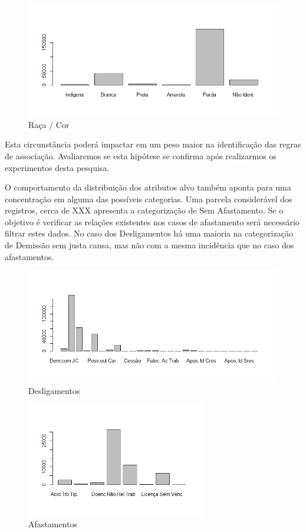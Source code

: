 \documentclass[12pt]{article}
\begin{document}
\FloatBarrier
\begin{figure}[!htb]
\centering
\includegraphics[width=1.0\textwidth]{Raca.png}
\caption{Raça / Cor}
\label{fig:exampleFig11}
\end{figure}

Esta circunstância poderá impactar em um peso maior na identificação das regras de associação. Avaliaremos se esta hipótese se confirma após realizarmos os experimentos desta pesquisa.

O comportamento da distribuição dos atributos alvo também aponta para uma concentração em alguma das possíveis categorias. Uma parcela considerável dos registros, cerca de XXX  apresenta a categorização de Sem Afastamento. Se o objetivo é verificar as relações existentes nos casos de afastamento será necessário filtrar estes dados.
No caso dos Desligamentos há uma maioria na categorização de Demissão sem justa causa, mas não com a mesma incidência que no caso dos afastamentos.

\FloatBarrier
\begin{figure}[!htb]
\centering
\includegraphics[width=1.0\textwidth]{Desligamento.png}
\caption{Desligamentos}
\label{fig:exampleFig3}
\end{figure}

\FloatBarrier
\begin{figure}[!htb]
\centering
\includegraphics[width=0.7\textwidth]{Afastamento.png}
\caption{Afastamentos}
\label{fig:exampleFig4}
\end{figure}
\end{document}
